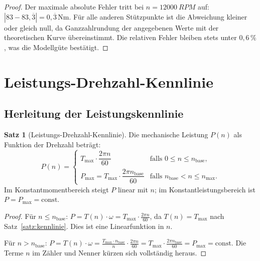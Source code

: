 ﻿\documentclass[a4paper,12pt]{article}
\theoremstyle{definition}
\newtheorem{satz}{Satz}
\begin{document}
\begin{proof}
    Der maximale absolute Fehler tritt bei $n = \SI{12000}{RPM}$ auf:
    $|83 - 83{,}\overline{3}| = 0{,}\overline{3}\,\si{\newton\metre}$. Für alle
    anderen Stützpunkte ist die Abweichung kleiner oder gleich null, da
    Ganzzahlrundung der angegebenen Werte mit der theoretischen Kurve übereinstimmt.
    Die relativen Fehler bleiben stets unter $0{,}6\,\%$, was die Modellgüte bestätigt.
\end{proof}

\section{Leistungs-Drehzahl-Kennlinie}
\label{sec:leistung}

\subsection{Herleitung der Leistungskennlinie}

\begin{satz}[Leistungs-Drehzahl-Kennlinie]
\label{satz:leistung}
    Die mechanische Leistung $P(n)$ als Funktion der Drehzahl beträgt:
    \[
        P(n) =
        \begin{cases}
            T_{\max} \cdot \dfrac{2\pi n}{60}             & \text{falls } 0 \leq n \leq n_{\mathrm{base}}, \\[6pt]
            P_{\max} = T_{\max} \cdot \dfrac{2\pi n_{\mathrm{base}}}{60} & \text{falls } n_{\mathrm{base}} < n \leq n_{\max}.
        \end{cases}
    \]
    Im Konstantmomentbereich steigt $P$ linear mit $n$; im Konstantleistungsbereich
    ist $P = P_{\max} = \mathrm{const}$.
\end{satz}

\begin{proof}
    Für $n \leq n_{\mathrm{base}}$: $P = T(n) \cdot \omega = T_{\max} \cdot \frac{2\pi n}{60}$,
    da $T(n) = T_{\max}$ nach Satz~\ref{satz:kennlinie}. Dies ist eine Linearfunktion in $n$.

    Für $n > n_{\mathrm{base}}$: $P = T(n) \cdot \omega =
    \frac{T_{\max} \cdot n_{\mathrm{base}}}{n} \cdot \frac{2\pi n}{60}
    = T_{\max} \cdot \frac{2\pi n_{\mathrm{base}}}{60} = P_{\max} = \mathrm{const}$.
    Die Terme $n$ im Zähler und Nenner kürzen sich vollständig heraus.
\end{proof}
\end{document}

